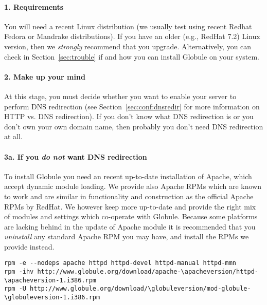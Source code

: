 \documentclass[10pt,a4paper]{article}
\makeatletter
\newcommand{\globuleversion}{1.3.1}
\newcommand{\apacheversion}{2.0.55}
\newenvironment{p}{\@open{P}{}}{\@close{P}}
\newenvironment{p}{}{\par}
\makeatother
\begin{document}
\paragraph*{1. Requirements}

\begin{p}
You will need a recent Linux distribution (we usually test using recent Redhat 
Fedora or Mandrake distributions). If you have an older (e.g., RedHat 7.2) Linux
version, then we \emph{strongly} recommend that you upgrade. Alternatively,
you can check in Section~\ref{sec:trouble} if and how you can install Globule
on your system.
\end{p}

\paragraph*{2. Make up your mind}

\begin{p}
At this stage, you must decide whether you want to enable your server to
perform DNS redirection (see Section~\ref{sec:conf:dnsredir} for more
information on HTTP vs.\/ DNS redirection). If you don't know what DNS
redirection is or you don't own your own domain name, then probably you don't
need DNS redirection at all.
\end{p}

\paragraph*{3a. If you \emph{do not} want DNS redirection}

\begin{p}
To install Globule you need an recent up-to-date installation of Apache, which
accept dynamic module loading.  We provide also Apache RPMs which are known to
work and are similar in functionality and construction as the official Apache
RPMs by RedHat.  We however keep more up-to-date and provide the right mix of
modules and settings which co-operate with Globule.  Because some platforms
are lacking behind in the update of Apache module it is recommended that you
\emph{uninstall} any standard Apache RPM you may have, and install the RPMs we
provide instead.
\end{p}

\begin{Verbatim}
rpm -e --nodeps apache httpd httpd-devel httpd-manual httpd-mmn
rpm -ihv http://www.globule.org/download/apache-\apacheversion/httpd-\apacheversion-1.i386.rpm
rpm -U http://www.globule.org/download/\globuleversion/mod-globule-\globuleversion-1.i386.rpm
\end{Verbatim}
\end{document}
